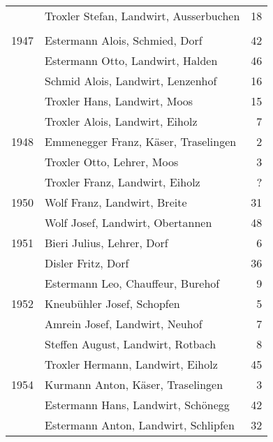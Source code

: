 {\begin{longtable}{ l l r }
                      & Troxler Stefan, Landwirt, Ausserbuchen    & 18          \\
        \\
        1947          & Estermann Alois, Schmied, Dorf            & 42          \\
                      & Estermann Otto, Landwirt, Halden          & 46          \\
                      & Schmid Alois, Landwirt, Lenzenhof         & 16          \\
                      & Troxler Hans, Landwirt, Moos              & 15          \\
                      & Troxler Alois, Landwirt, Eiholz           & 7           \\
        1948          & Emmenegger Franz, Käser, Traselingen      & 2           \\
                      & Troxler Otto, Lehrer, Moos                & 3           \\
                      & Troxler Franz, Landwirt, Eiholz           & ?           \\
        1950          & Wolf Franz, Landwirt, Breite              & 31          \\
                      & Wolf Josef, Landwirt, Obertannen          & 48          \\
        1951          & Bieri Julius, Lehrer, Dorf                & 6           \\
                      & Disler Fritz, Dorf                        & 36          \\
                      & Estermann Leo, Chauffeur, Burehof         & 9           \\
        1952          & Kneubühler Josef, Schopfen                & 5           \\
                      & Amrein Josef, Landwirt, Neuhof            & 7           \\
                      & Steffen August, Landwirt, Rotbach         & 8           \\
                      & Troxler Hermann, Landwirt, Eiholz         & 45          \\
        1954          & Kurmann Anton, Käser, Traselingen         & 3           \\
                      & Estermann Hans, Landwirt, Schönegg        & 42          \\
                      & Estermann Anton, Landwirt, Schlipfen      & 32          \\

\end{longtable}}

